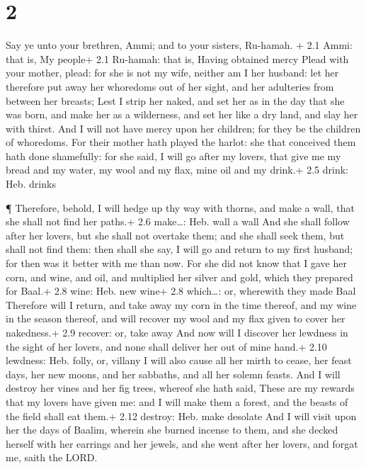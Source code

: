 \hypertarget{section-1}{%
\section{2}\label{section-1}}

 Say ye unto your brethren, Ammi; and to your sisters,
Ru-hamah. + 2.1 Ammi: that is, My people+ 2.1 Ru-hamah: that is, Having
obtained mercy  Plead with your mother, plead: for she is
not my wife, neither am I her husband: let her therefore put away her
whoredoms out of her sight, and her adulteries from between her breasts;
 Lest I strip her naked, and set her as in the day that she
was born, and make her as a wilderness, and set her like a dry land, and
slay her with thirst.  And I will not have mercy upon her
children; for they be the children of whoredoms.  For their
mother hath played the harlot: she that conceived them hath done
shamefully: for she said, I will go after my lovers, that give me my
bread and my water, my wool and my flax, mine oil and my drink.+ 2.5
drink: Heb. drinks

 ¶ Therefore, behold, I will hedge up thy way with thorns,
and make a wall, that she shall not find her paths.+ 2.6 make\ldots:
Heb. wall a wall  And she shall follow after her lovers, but
she shall not overtake them; and she shall seek them, but shall not find
them: then shall she say, I will go and return to my first husband; for
then was it better with me than now.  For she did not know
that I gave her corn, and wine, and oil, and multiplied her silver and
gold, which they prepared for Baal.+ 2.8 wine: Heb. new wine+ 2.8
which\ldots: or, wherewith they made Baal  Therefore will I
return, and take away my corn in the time thereof, and my wine in the
season thereof, and will recover my wool and my flax given to cover her
nakedness.+ 2.9 recover: or, take away  And now will I
discover her lewdness in the sight of her lovers, and none shall deliver
her out of mine hand.+ 2.10 lewdness: Heb. folly, or, villany
 I will also cause all her mirth to cease, her feast days,
her new moons, and her sabbaths, and all her solemn feasts.
 And I will destroy her vines and her fig trees, whereof
she hath said, These are my rewards that my lovers have given me: and I
will make them a forest, and the beasts of the field shall eat them.+
2.12 destroy: Heb. make desolate  And I will visit upon her
the days of Baalim, wherein she burned incense to them, and she decked
herself with her earrings and her jewels, and she went after her lovers,
and forgat me, saith the LORD.

